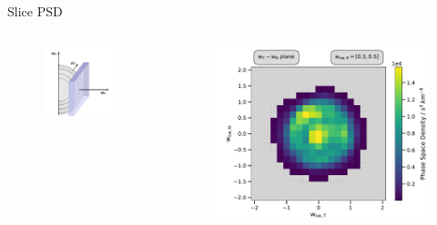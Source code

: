 \documentclass{beamer}
\begin{document}

\begin{frame}{Slice PSD}
\begin{columns}
	\column{3cm}
	\begin{figure}
		\includegraphics[scale=.7]{Pics/slice_R2.pdf}
	\end{figure}
	\column{6.5cm}
	\begin{figure}
	\includegraphics[scale=.45]{Pics/slice_psd.pdf}
	\end{figure}
\column{.5cm}
\end{columns}
\end{frame}
\end{document}
